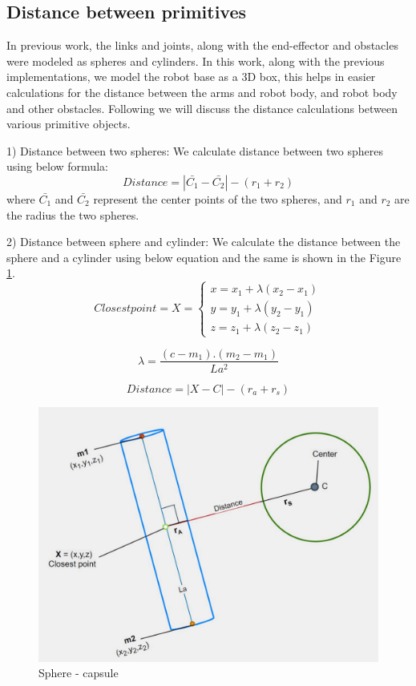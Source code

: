 \documentclass[a4paper, 11.5pt, conference]{ieeeconf}      %
\begin{document}
\subsection{Distance between primitives}
In previous work, the links and joints, along with the end-effector and obstacles were modeled as spheres and cylinders. In this work, along with the previous implementations, we model the robot base as a 3D box, this helps in easier calculations for the distance between the arms and robot body, and robot body and other obstacles. Following we will discuss the distance calculations between various primitive objects.

1) Distance between two spheres:
We calculate distance between two spheres using below formula:
\begin{equation}
	Distance = |\bar{C_1}-\bar{C_2}| - (r_1 + r_2)
\end{equation}
where $\bar{C_1}$ and $\bar{C_2}$ represent the center points of the two spheres, and $r_1$ and $r_2$ are the radius the two spheres.

2) Distance between sphere and cylinder:
We calculate the distance between the sphere and a cylinder using below equation and the same is shown in the Figure \ref{fig:sphere_capsule}.
\begin{equation}
	Closest point = X = 	\begin{cases}
        x = x_1 + \lambda(x_2 - x_1) \\
        y = y_1 + \lambda(y_2 - y_1) \\
        z = z_1 + \lambda(z_2 - z_1) 
        \label{eq:capsule_point}
    \end{cases}
\end{equation}

\begin{equation}
	\lambda = \frac{(c-m_1).(m_2-m_1)}{La^2}
\end{equation}

\begin{equation}
	Distance = |X-C| - (r_a + r_s)
\end{equation}

\begin{figure}[H]
    \centering
    \includegraphics[scale=0.3]{images/sphere_capsule.png}
    \caption{Sphere - capsule}
    \label{fig:sphere_capsule}
\end{figure}
\end{document}
